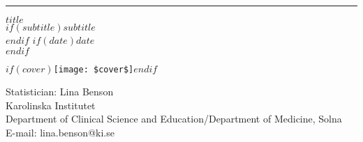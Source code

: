 
\rule{\textwidth}{1pt} %
\vspace{0.1\textheight} %

\centering %

{\huge\bfseries\nohyphens{$title$}}\\[2\baselineskip] 
$if(subtitle)${\large\textit{$subtitle$}}\\[2\baselineskip]$endif$
$if(date)${\large\textit{$date$}}\\[2\baselineskip]$endif$

$if(cover)$\texttt{[image: \$cover\$]}$endif$


\vfill

Statistician: Lina Benson\\
Karolinska Institutet\\
Department of Clinical Science and Education/Department of Medicine, Solna\\
E-mail: lina.benson@ki.se